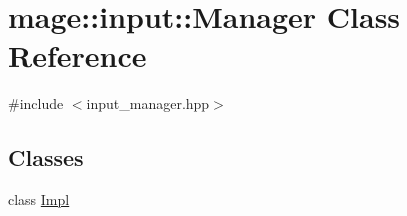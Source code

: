 \hypertarget{classmage_1_1input_1_1_manager}{}\section{mage\+:\+:input\+:\+:Manager Class Reference}
\label{classmage_1_1input_1_1_manager}


{\ttfamily \#include $<$input\+\_\+manager.\+hpp$>$}

\subsection*{Classes}
\begin{DoxyCompactItemize}
\item 
class \mbox{\hyperlink{classmage_1_1input_1_1_manager_1_1_impl}{Impl}}
\end{DoxyCompactItemize}
